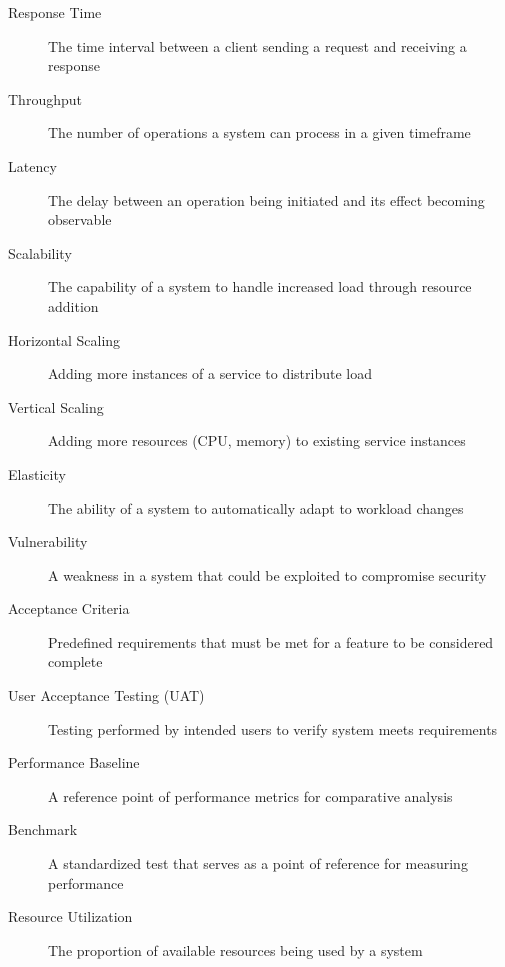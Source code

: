 \begin{description}
    \item[Response Time] The time interval between a client sending a request and receiving a response
    \item[Throughput] The number of operations a system can process in a given timeframe
    \item[Latency] The delay between an operation being initiated and its effect becoming observable
    \item[Scalability] The capability of a system to handle increased load through resource addition
    \item[Horizontal Scaling] Adding more instances of a service to distribute load
    \item[Vertical Scaling] Adding more resources (CPU, memory) to existing service instances
    \item[Elasticity] The ability of a system to automatically adapt to workload changes
    \item[Vulnerability] A weakness in a system that could be exploited to compromise security
    \item[Acceptance Criteria] Predefined requirements that must be met for a feature to be considered complete
    \item[User Acceptance Testing (UAT)] Testing performed by intended users to verify system meets requirements
    \item[Performance Baseline] A reference point of performance metrics for comparative analysis
    \item[Benchmark] A standardized test that serves as a point of reference for measuring performance
    \item[Resource Utilization] The proportion of available resources being used by a system
\end{description} 